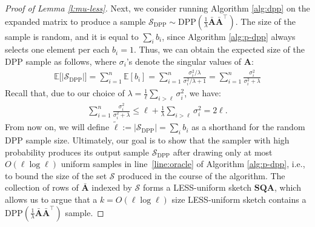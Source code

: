 \documentclass[11pt]{article}
\let\origtop\top
\renewcommand\top{{\scriptscriptstyle{\origtop}}}
\def\DPP{\mathrm{DPP}}
\def\A{{\mathbf A}}
\def\Q{{\mathbf Q}}
\def\S{{\mathbf S}}
\def\setS{{\mathcal S}}
\def\E{{\mathds E}}
\begin{document}
\begin{proof}[Proof of Lemma \ref{l:mu-less}]
Next, we consider running Algorithm \ref{alg:dpp} on the expanded matrix to produce a sample $\setS_{\DPP}\sim\DPP(\frac1\lambda\bar\A\bar\A^\top)$. The size of the sample is random, and it is equal to $\sum_ib_i$, since Algorithm \ref{alg:p-dpp} always selects one element per each $b_i=1$. Thus, we can obtain the expected size of the DPP sample as follows, where $\sigma_i$'s denote the singular values of $\A$:
\begin{align*}
    \E\big[|\setS_{\DPP}|\big] = \sum_{i=1}^n\E[b_i] = \sum_{i=1}^n\frac{\sigma_i^2/\lambda}{\sigma_i^2/\lambda+1} =\sum_{i=1}^n\frac{\sigma_i^2}{\sigma_i^2+\lambda}
\end{align*}
Recall that, due to our choice of $\lambda = \frac1\ell\sum_{i>\ell}\sigma_i^2$, we have:
\begin{align*}
\sum_{i=1}^n\frac{\sigma_i^2}{\sigma_i^2+\lambda}\leq \ell + \frac1\lambda \sum_{i>\ell}\sigma_i^2 = 2\ell.
\end{align*}
From now on, we will define $\tilde\ell:=|\setS_{\DPP}|=\sum_ib_i$ as a shorthand for the random DPP sample size.   
Ultimately, our goal is to show that the sampler with high probability produces its output sample $\setS_{\DPP}$ after drawing only at most $O(\ell\log \ell)$ uniform samples in line~\ref{line:oracle} of Algorithm \ref{alg:p-dpp}, i.e., to bound the size of the set $\setS$ produced in the course of the algorithm. The collection of rows of $\bar\A$ indexed by $\setS$ forms a LESS-uniform sketch $\S\Q\A$, which allows us to argue that a $k=O(\ell\log \ell)$ size LESS-uniform sketch contains a  $\DPP(\frac1\lambda\bar\A\bar\A^\top)$ sample.


\end{proof}
\end{document}
